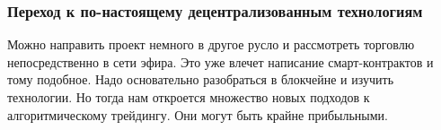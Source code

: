 \begin{itemize}
\subsubsection{Переход к по-настоящему децентрализованным технологиям}
Можно направить проект немного в другое русло и рассмотреть торговлю непосредственно в сети эфира. Это уже влечет написание смарт-контрактов и тому подобное. Надо основательно разобраться в блокчейне и изучить технологии. Но тогда нам откроется множество новых подходов к алгоритмическому трейдингу. Они могут быть крайне прибыльными.
    
\end{itemize}
